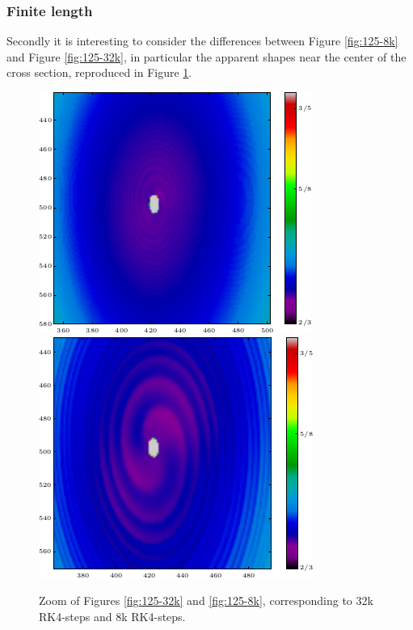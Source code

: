 \documentclass[a4paper]{article}
\begin{document}
\subsubsection{Finite length}
Secondly it is interesting to consider the differences between Figure \ref{fig:125-8k} and Figure \ref{fig:125-32k}, in particular the apparent shapes near the center of the cross section, reproduced in Figure \ref{fig:artefacts}.
\begin{figure}[!hb]
	\centering
{}
  \includegraphics[width=\linewidth]{Figures/artefact32k.png}
\endminipage ~
  \includegraphics[width=\linewidth]{Figures/artefact8k.png}
\endminipage\hfill
	\caption{Zoom of Figures \ref{fig:125-32k} and \ref{fig:125-8k}, corresponding to 32k RK4-steps and 8k RK4-steps.}\label{fig:artefacts}
\end{figure}
\end{document}
